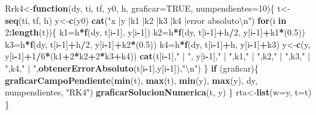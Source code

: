 \documentclass[]{article}
\newenvironment{Shaded}{\begin{snugshade}}{\end{snugshade}}
\newcommand{\KeywordTok}[1]{\textcolor[rgb]{0.13,0.29,0.53}{\textbf{#1}}}
\newcommand{\DataTypeTok}[1]{\textcolor[rgb]{0.13,0.29,0.53}{#1}}
\newcommand{\DecValTok}[1]{\textcolor[rgb]{0.00,0.00,0.81}{#1}}
\newcommand{\FloatTok}[1]{\textcolor[rgb]{0.00,0.00,0.81}{#1}}
\newcommand{\CharTok}[1]{\textcolor[rgb]{0.31,0.60,0.02}{#1}}
\newcommand{\StringTok}[1]{\textcolor[rgb]{0.31,0.60,0.02}{#1}}
\newcommand{\OtherTok}[1]{\textcolor[rgb]{0.56,0.35,0.01}{#1}}
\newcommand{\ControlFlowTok}[1]{\textcolor[rgb]{0.13,0.29,0.53}{\textbf{#1}}}
\newcommand{\OperatorTok}[1]{\textcolor[rgb]{0.81,0.36,0.00}{\textbf{#1}}}
\newcommand{\NormalTok}[1]{#1}
\begin{document}
\begin{Shaded}
\begin{Highlighting}[]
\NormalTok{Rrk4<-}\ControlFlowTok{function}\NormalTok{(dy, ti, tf, y0, h, }\DataTypeTok{graficar=}\OtherTok{TRUE}\NormalTok{, }\DataTypeTok{numpendientes=}\DecValTok{10}\NormalTok{)\{}
\NormalTok{  t<-}\KeywordTok{seq}\NormalTok{(ti, tf, h)}
\NormalTok{  y<-}\KeywordTok{c}\NormalTok{(y0)}
  \KeywordTok{cat}\NormalTok{(}\StringTok{"x    |y         |k1        |k2        |k3        |k4       |error absoluto}\CharTok{\textbackslash{}n}\StringTok{"}\NormalTok{)}
  \ControlFlowTok{for}\NormalTok{(i }\ControlFlowTok{in} \DecValTok{2}\OperatorTok{:}\KeywordTok{length}\NormalTok{(t))\{}
\NormalTok{    k1=h}\OperatorTok{*}\KeywordTok{f}\NormalTok{(dy, t[i}\OperatorTok{-}\DecValTok{1}\NormalTok{], y[i}\OperatorTok{-}\DecValTok{1}\NormalTok{])}
\NormalTok{    k2=h}\OperatorTok{*}\KeywordTok{f}\NormalTok{(dy, t[i}\OperatorTok{-}\DecValTok{1}\NormalTok{]}\OperatorTok{+}\NormalTok{h}\OperatorTok{/}\DecValTok{2}\NormalTok{, y[i}\OperatorTok{-}\DecValTok{1}\NormalTok{]}\OperatorTok{+}\NormalTok{k1}\OperatorTok{*}\NormalTok{(}\FloatTok{0.5}\NormalTok{))}
\NormalTok{    k3=h}\OperatorTok{*}\KeywordTok{f}\NormalTok{(dy, t[i}\OperatorTok{-}\DecValTok{1}\NormalTok{]}\OperatorTok{+}\NormalTok{h}\OperatorTok{/}\DecValTok{2}\NormalTok{, y[i}\OperatorTok{-}\DecValTok{1}\NormalTok{]}\OperatorTok{+}\NormalTok{k2}\OperatorTok{*}\NormalTok{(}\FloatTok{0.5}\NormalTok{))}
\NormalTok{    k4=h}\OperatorTok{*}\KeywordTok{f}\NormalTok{(dy, t[i}\OperatorTok{-}\DecValTok{1}\NormalTok{]}\OperatorTok{+}\NormalTok{h, y[i}\OperatorTok{-}\DecValTok{1}\NormalTok{]}\OperatorTok{+}\NormalTok{k3)}
\NormalTok{    y<-}\KeywordTok{c}\NormalTok{(y, y[i}\OperatorTok{-}\DecValTok{1}\NormalTok{]}\OperatorTok{+}\DecValTok{1}\OperatorTok{/}\DecValTok{6}\OperatorTok{*}\NormalTok{(k1}\OperatorTok{+}\DecValTok{2}\OperatorTok{*}\NormalTok{k2}\OperatorTok{+}\DecValTok{2}\OperatorTok{*}\NormalTok{k3}\OperatorTok{+}\NormalTok{k4))}
    \KeywordTok{cat}\NormalTok{(t[i}\OperatorTok{-}\DecValTok{1}\NormalTok{],}\StringTok{" | "}\NormalTok{, y[i}\OperatorTok{-}\DecValTok{1}\NormalTok{],}\StringTok{" | "}\NormalTok{,k1,}\StringTok{" | "}\NormalTok{,k2,}\StringTok{" | "}\NormalTok{,k3,}\StringTok{" | "}\NormalTok{,k4,}\StringTok{" | "}\NormalTok{,}\KeywordTok{obtenerErrorAbsoluto}\NormalTok{(t[i}\OperatorTok{-}\DecValTok{1}\NormalTok{],y[i}\OperatorTok{-}\DecValTok{1}\NormalTok{]),}\StringTok{"}\CharTok{\textbackslash{}n}\StringTok{"}\NormalTok{)}
\NormalTok{  \}}
  \ControlFlowTok{if}\NormalTok{ (graficar)\{}
    \KeywordTok{graficarCampoPendiente}\NormalTok{(}\KeywordTok{min}\NormalTok{(t), }\KeywordTok{max}\NormalTok{(t), }\KeywordTok{min}\NormalTok{(y), }\KeywordTok{max}\NormalTok{(y), dy, numpendientes, }\StringTok{"RK4"}\NormalTok{)}
    \KeywordTok{graficarSolucionNumerica}\NormalTok{(t, y)}
\NormalTok{  \}}
\NormalTok{  rta<-}\KeywordTok{list}\NormalTok{(}\DataTypeTok{w=}\NormalTok{y, }\DataTypeTok{t=}\NormalTok{t)}
\NormalTok{\}}


\end{Highlighting}
\end{Shaded}
\end{document}
